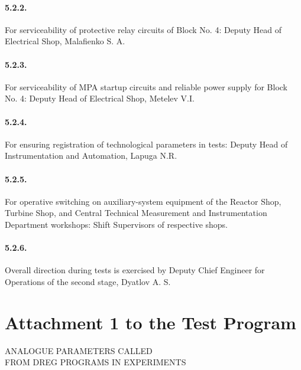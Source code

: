 \documentclass[openright]{bookest}
\begin{document}
\paragraph{5.2.2.} For serviceability of protective relay circuits of Block No. 4: Deputy Head of Electrical Shop, Malafienko S. A.

\paragraph{5.2.3.} For serviceability of MPA startup circuits and reliable power supply for Block No. 4: Deputy Head of Electrical Shop, Metelev V.I.

\paragraph{5.2.4.} For ensuring registration of technological parameters in tests: Deputy Head of Instrumentation and Automation, Lapuga N.R.

\paragraph{5.2.5.} For operative switching on auxiliary-system equipment of the Reactor Shop, Turbine Shop, and Central Technical Measurement and Instrumentation Department workshops: Shift Supervisors of respective shops.

\paragraph{5.2.6.} Overall direction during tests is exercised by Deputy Chief Engineer for Operations of the second stage, Dyatlov A. S.

\section*{Attachment 1 to the Test Program}

\begin{center}
ANALOGUE PARAMETERS CALLED \\
FROM DREG PROGRAMS IN EXPERIMENTS \\
\end{center}
\end{document}
